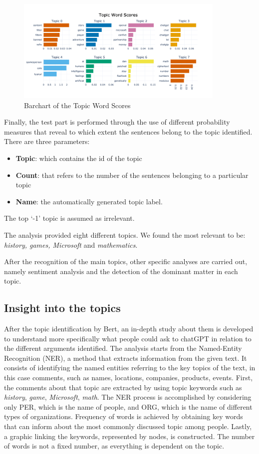 \documentclass[sigchi]{acmart}
\begin{document}
\begin{figure}[H]
  \centering
  \includegraphics[height=5cm]{barchart.png}
  \caption{Barchart of the Topic Word Scores}
  \label{fig:immagine_bar}
\end{figure}



Finally, the test part is performed through the use of different probability measures that reveal to which extent the sentences belong to the topic identified. There are three parameters:
\begin{itemize}
  \item \textbf{Topic}: which contains the id of the topic
  \item \textbf{Count}: that refers to the number of the sentences belonging to a particular topic
  \item \textbf{Name}: the automatically generated topic label. 
\end{itemize}The top `-1' topic is assumed as irrelevant.  

The analysis provided eight different topics. We found the most relevant to be: \textit{history, games, Microsoft} and \textit{mathematics}.

After the recognition of the main topics, other specific analyses are carried out, namely sentiment analysis and the detection of the dominant matter in each topic. 



\subsection{Insight into the topics}
After the topic identification by Bert, an in-depth study about them is developed to understand more specifically what people could ask to chatGPT in relation to the different arguments identified. The analysis starts from the Named-Entity Recognition (NER), a method that extracts information from the given text. It consists of identifying the named entities referring to the key topics of the text, in this case comments, such as names, locations, companies, products, events. First, the comments about that topic are extracted by using topic keywords such as \textit{history}, \textit{game}, \textit{Microsoft}, \textit{math}. The NER process is accomplished by considering only \textsc{PER}, which is the name of people, and \textsc{ORG}, which is the name of different types of organizations. Frequency of words is achieved by obtaining key words that can inform about the most commonly discussed topic among people. Lastly, a graphic linking the keywords, represented by nodes, is constructed. The number of words is not a fixed number, as everything is dependent on the topic. 
 
\end{document}
